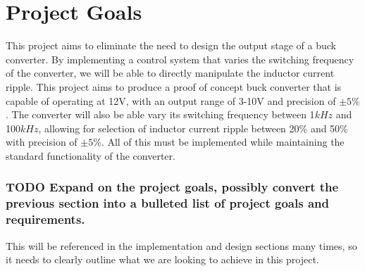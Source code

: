 \section{Project Goals}\label{S:goals}

This project aims to eliminate the need to design the output stage of a buck converter. By implementing a control system that varies the switching frequency of the converter, we will be able to directly manipulate the inductor current ripple. This project aims to produce a proof of concept buck converter that is capable of operating at 12V, with an output range of 3-10V and precision of $\pm5\%$. The converter will also be able vary its switching frequency between 1$kHz$ and 100$kHz$, allowing for selection of inductor current ripple between 20\% and 50\% with precision of $\pm5\%$. All of this must be implemented while maintaining the standard functionality of the converter.

\subsubsection{TODO Expand on the project goals, possibly convert the previous section into a bulleted list of project goals and requirements.}

This will be referenced in the implementation and design sections many times, so it needs to clearly outline what we are looking to achieve in this project. 